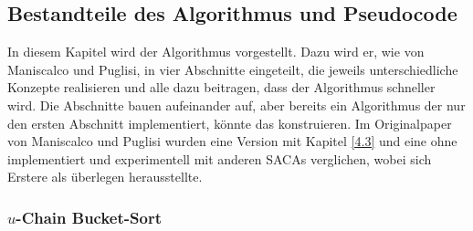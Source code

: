 \subsection{Bestandteile des Algorithmus und Pseudocode} \label{mainPart}
In diesem Kapitel wird der Algorithmus vorgestellt. Dazu wird er, wie von Maniscalco und Puglisi, in vier Abschnitte eingeteilt, die jeweils unterschiedliche Konzepte realisieren und alle dazu beitragen, dass der Algorithmus schneller wird. 
Die Abschnitte bauen aufeinander auf, aber bereits ein Algorithmus der nur den ersten Abschnitt implementiert, könnte das \isa konstruieren. Im Originalpaper von Maniscalco und Puglisi wurden eine Version mit Kapitel \ref{4.3} und eine ohne implementiert und experimentell mit anderen SACAs verglichen, wobei sich Erstere als überlegen herausstellte.

\subsubsection{$u$-Chain Bucket-Sort}
\label{4.1}

